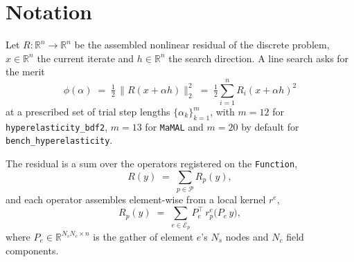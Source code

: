 \documentclass[11pt]{article}
\newcommand{\R}{\mathbb{R}}
\begin{document}
\begin{abstract}
The resulting kernel produces all $m$ merit values in one pass and materializes
no per-step residual vector --- indeed no accumulator array at all.  It works one
node at a time, so that node's value is complete once its incident elements have
been summed and can be squared in registers; the SIMD lanes are filled from
within that one node's patch, first by its incident elements and then by the
trial steps --- two sequential vector loops, never nested, the first
precomputing everything the second would otherwise recompute.  Normalizing each
element's orientation so the node is always the same local node makes its basis
function the same in every lane and at every step, which is what allows those
terms to leave both loops.  The second loop's lanes are the trial
steps, because $m$ is a quantity the line search chooses and is therefore set to
the hardware's vector length --- unlike the number of elements incident on a
node, which the mesh fixes.  It is the only arrangement built.  What this is worth is bounded by the constitutive evaluation, which
repeats per trial step by construction.  The same reorganization is already in
place for the energy merit, and measured on the same node it costs $5.7\times$
one step at $m=12$ for a Mooney--Rivlin-class material and $3.7\times$ for
linear elasticity: the step-independent fraction rises from $6\%$ to $57\%$.
That is the quantity this work moves, and we report it in preference to the
ratio, because a material whose stress evaluation dominates pays for every step
it samples and no arrangement of the loops can make the cost flat.
\end{abstract}

\section{Notation}

Let $R:\R^n\to\R^n$ be the assembled nonlinear residual of the discrete problem,
$x\in\R^n$ the current iterate and $h\in\R^n$ the search direction.  A line
search asks for the merit
\begin{equation}
  \phi(\alpha) \;=\; \tfrac12\,\bigl\|R(x+\alpha h)\bigr\|_2^2
  \;=\; \tfrac12 \sum_{i=1}^{n} R_i(x+\alpha h)^2
  \label{eq:merit}
\end{equation}
at a prescribed set of trial step lengths $\{\alpha_k\}_{k=1}^{m}$, with $m=12$
for \texttt{hyperelasticity\_bdf2}, $m=13$ for \texttt{MaMAL} and $m=20$ by
default for \texttt{bench\_hyperelasticity}.

The residual is a sum over the operators registered on the
\texttt{Function},
\begin{equation}
  R(y) \;=\; \sum_{p\in\mathcal{P}} R_p(y),
  \label{eq:opsum}
\end{equation}
and each operator assembles element-wise from a local kernel $r^e$,
\begin{equation}
  R_p(y) \;=\; \sum_{e\in\mathcal{E}_p} P_e^{\!\top}\, r_p^e\bigl(P_e\,y\bigr),
  \label{eq:assembly}
\end{equation}
where $P_e\in\R^{N_s N_c\times n}$ is the gather of element $e$'s $N_s$ nodes and
$N_c$ field components.
\end{document}

